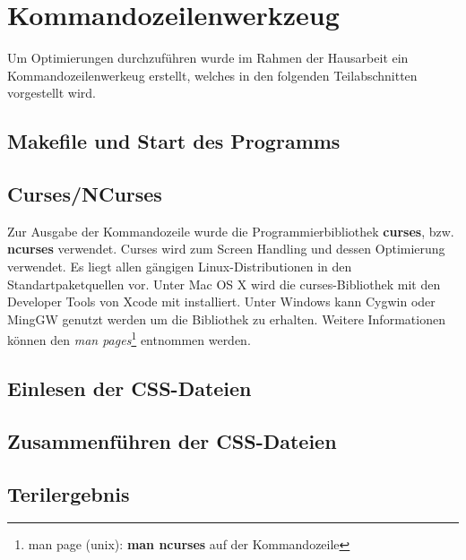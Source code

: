 \section{Kommandozeilenwerkzeug}
Um Optimierungen durchzuführen wurde im Rahmen der Hausarbeit ein Kommandozeilenwerkeug erstellt, welches in den folgenden Teilabschnitten vorgestellt wird.

\subsection{Makefile und Start des Programms}

\subsection{Curses/NCurses}

Zur Ausgabe der Kommandozeile wurde die Programmierbibliothek \textbf{curses}, bzw. \textbf{ncurses} verwendet. Curses wird zum Screen Handling und dessen Optimierung verwendet. Es liegt allen gängigen Linux-Distributionen in den Standartpaketquellen vor. Unter Mac OS X wird die curses-Bibliothek mit den Developer Tools von Xcode mit installiert. Unter Windows kann Cygwin oder MingGW genutzt werden um die Bibliothek zu erhalten. Weitere Informationen können den \textit{man pages}\footnote{man page (unix): \textbf{man ncurses} auf der Kommandozeile} entnommen werden.

\subsection{Einlesen der CSS-Dateien}
\subsection{Zusammenführen der CSS-Dateien}
\subsection{Terilergebnis}
